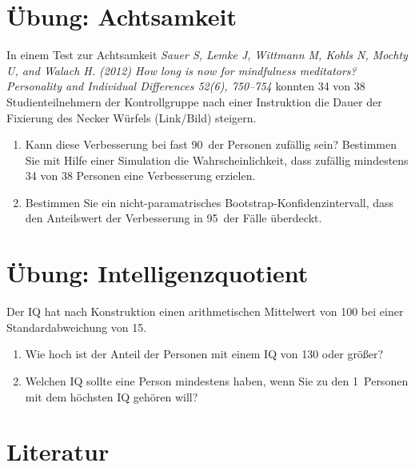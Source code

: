 \documentclass[12pt,ngerman,paper=a4,pagesize,DIV=13]{scrreprt}
\providecommand{\tightlist}{%
  \setlength{\itemsep}{0pt}\setlength{\parskip}{0pt}}
\begin{document}
\hypertarget{ubung-achtsamkeit}{%
\section{Übung: Achtsamkeit}\label{ubung-achtsamkeit}}

In einem Test zur Achtsamkeit \emph{Sauer S, Lemke J, Wittmann M, Kohls
N, Mochty U, and Walach H. (2012) How long is now for mindfulness
meditators? Personality and Individual Differences 52(6), 750--754}
konnten 34 von 38 Studienteilnehmern der Kontrollgruppe nach einer
Instruktion die Dauer der Fixierung des Necker Würfels (Link/Bild)
steigern.

\begin{enumerate}
\def\labelenumi{\arabic{enumi}.}
\tightlist
\item
  Kann diese Verbesserung bei fast 90\(\,\) der Personen zufällig sein?
  Bestimmen Sie mit Hilfe einer Simulation die Wahrscheinlichkeit, dass
  zufällig mindestens 34 von 38 Personen eine Verbesserung erzielen.
\item
  Bestimmen Sie ein nicht-paramatrisches Bootstrap-Konfidenzintervall,
  dass den Anteilswert der Verbesserung in 95\(\,\) der Fälle überdeckt.
\end{enumerate}

\hypertarget{ubung-intelligenzquotient}{%
\section{Übung: Intelligenzquotient}\label{ubung-intelligenzquotient}}

Der IQ hat nach Konstruktion einen arithmetischen Mittelwert von 100 bei
einer Standardabweichung von 15.

\begin{enumerate}
\def\labelenumi{\arabic{enumi}.}
\tightlist
\item
  Wie hoch ist der Anteil der Personen mit einem IQ von 130 oder größer?
\item
  Welchen IQ sollte eine Person mindestens haben, wenn Sie zu den
  1\(\,\) Personen mit dem höchsten IQ gehören will?
\end{enumerate}

\hypertarget{literatur-2}{%
\section{Literatur}\label{literatur-2}}
\end{document}
